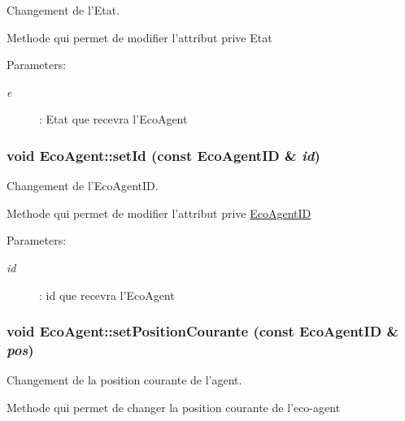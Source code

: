 Changement de l'Etat. 

Methode qui permet de modifier l'attribut prive Etat

\begin{Desc}
\item[Parameters:]
\begin{description}
\item[{\em e}]: Etat que recevra l'EcoAgent \end{description}
\end{Desc}
\hypertarget{classEcoAgent_ef2dde1272916b9f3a8f5a663bf96f69}{
\subsubsection[{setId}]{\setlength{\rightskip}{0pt plus 5cm}void EcoAgent::setId (const {\bf EcoAgentID} \& {\em id})}}
\label{classEcoAgent_ef2dde1272916b9f3a8f5a663bf96f69}


Changement de l'EcoAgentID. 

Methode qui permet de modifier l'attribut prive \hyperlink{classEcoAgentID}{EcoAgentID}

\begin{Desc}
\item[Parameters:]
\begin{description}
\item[{\em id}]: id que recevra l'EcoAgent \end{description}
\end{Desc}
\hypertarget{classEcoAgent_0365707b7bc808dd45fb34d1c076f362}{
\subsubsection[{setPositionCourante}]{\setlength{\rightskip}{0pt plus 5cm}void EcoAgent::setPositionCourante (const {\bf EcoAgentID} \& {\em pos})}}
\label{classEcoAgent_0365707b7bc808dd45fb34d1c076f362}


Changement de la position courante de l'agent. 

Methode qui permet de changer la position courante de l'eco-agent

